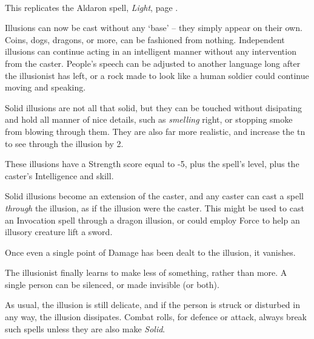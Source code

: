 \begin{multicols}{2}
\\
This replicates the Aldaron spell, \textit{Light}, page \pageref{light}.


Illusions can now be cast without any `base' -- they simply appear on their own.
Coins, dogs, dragons, or more, can be fashioned from nothing.
Independent illusions can continue acting in an intelligent manner without any intervention from the caster.
People's speech can be adjusted to another language long after the illusionist has left, or a rock made to look like a human soldier could continue moving and speaking.


Solid illusions are not all that solid, but they can be touched without disipating and hold all manner of nice details, such as \emph{smelling} right, or stopping smoke from blowing through them.  They are also far more realistic, and increase the \gls{tn} to see through the illusion by 2.

These illusions have a Strength score equal to -5, plus the spell's level, plus the caster's Intelligence and skill.

Solid illusions become an extension of the caster, and any caster can cast a spell \textit{through} the illusion, as if the illusion were the caster.  This might be used to cast an Invocation spell through a dragon illusion, or could employ Force to help an illusory creature lift a sword.

Once even a single point of Damage has been dealt to the illusion, it vanishes.


The illusionist finally learns to make less of something, rather than more.  A single person can be silenced, or made invisible (or both).

As usual, the illusion is still delicate, and if the person is struck or disturbed in any way, the illusion dissipates.  Combat rolls, for defence or attack, always break such spells unless they are also make \textit{Solid}.

\end{multicols}


